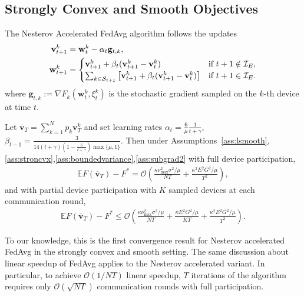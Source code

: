 \subsection{Strongly Convex and Smooth Objectives}
\begin{comment}
We first show that the Nesterov accelerated FedAvg has $\mathcal{O}(1/NT)$
convergence rate for $\mu$-strongly convex and $L$-smooth objectives.
\end{comment}
The Nesterov Accelerated FedAvg algorithm follows the updates
\begin{align*}
\mathbf{v}_{t+1}^{k} & =\mathbf{w}_{t}^{k}-\alpha_{t}\mathbf{g}_{t,k},\\
\mathbf{w}_{t+1}^{k} & =\begin{cases}
\mathbf{v}_{t+1}^{k}+\beta_{t}(\mathbf{v}_{t+1}^{k}-\mathbf{v}_{t}^{k}) & \text{if }t+1\notin\mathcal{I}_{E},\\
\sum_{k \in {\mathcal{S}}_{t+1}}\left[\mathbf{v}_{t+1}^{k}+\beta_{t}(\mathbf{v}_{t+1}^{k}-\mathbf{v}_{t}^{k})\right] & \text{if }t+1\in\mathcal{I}_{E}.
\end{cases}
\end{align*}
where $\mathbf{g}_{t,k}:=\nabla F_{k}(\mathbf{w}_{t}^{k},\xi_{t}^{k})$ is
the stochastic gradient sampled on the $k$-th device at time $t$.  
\begin{theorem}
	\label{thm:nesterov_scvx}Let $\overline{\mathbf{v}}_{T}=\sum_{k=1}^{N}p_{k}\mathbf{v}_{T}^{k}$
	and set learning rates $\alpha_{t}=\frac{6}{\mu}\frac{1}{t+\gamma}$,  $\beta_{t-1}=\frac{3}{14(t+\gamma)(1-\frac{6}{t+\gamma})\max\{\mu,1\}}$. Then under Assumptions~\ref{ass:lsmooth},\ref{ass:stroncvx},\ref{ass:boundedvariance},\ref{ass:subgrad2} with full device participation, 
	\begin{align*}
	\mathbb{E}F(\overline{\mathbf{v}}_{T})-F^{\ast}=\mathcal{O}\left(\frac{\kappa\nu_{\max}^{2}\sigma^{2}/\mu}{NT}+\frac{\kappa^{2}E^{2}G^{2}/\mu}{T^{2}}\right),
	\end{align*}
	and with partial device participation with $K$ sampled devices at
	each communication round, 
	\begin{align*}
	\mathbb{E}F(\overline{\mathbf{v}}_{T})-F^{\ast}\leq\mathcal{O}\left(\frac{\kappa\nu_{\max}^{2}\sigma^{2}/\mu}{NT}+\frac{\kappa E^{2}G^{2}/\mu}{KT}+\frac{\kappa^{2}E^{2}G^{2}/\mu}{T^{2}}\right).
	\end{align*}
\end{theorem}
%
To our knowledge, this is the first convergence result for Nesterov
accelerated FedAvg in the strongly convex and smooth setting. The
same discussion about linear speedup of FedAvg applies to the Nesterov
accelerated variant. In particular, to achieve $\mathcal{O}(1/NT)$
linear speedup, $T$ iterations of the algorithm requires only $\mathcal{O}(\sqrt{NT})$
communication rounds with full participation. 


